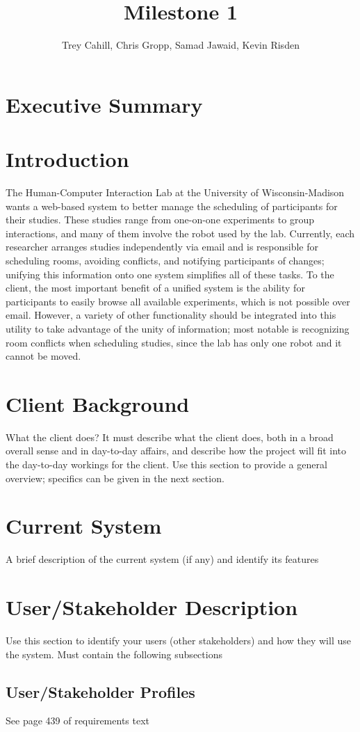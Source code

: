 \documentclass{article}
\title{Milestone 1}
\author{Trey Cahill, Chris Gropp, Samad Jawaid, Kevin Risden}
\begin{document}
\maketitle
\section{Executive Summary}
\section{Introduction}
The Human-Computer Interaction Lab at the University of Wisconsin-Madison wants a web-based system to better manage the scheduling of participants for their studies.  These studies range from one-on-one experiments to group interactions, and many of them involve the robot used by the lab.  Currently, each researcher arranges studies independently via email and is responsible for scheduling rooms, avoiding conflicts, and notifying participants of changes; unifying this information onto one system simplifies all of these tasks.  To the client, the most important benefit of a unified system is the ability for participants to easily browse all available experiments, which is not possible over email.  However, a variety of other functionality should be integrated into this utility to take advantage of the unity of information; most notable is recognizing room conflicts when scheduling studies, since the lab has only one robot and it cannot be moved.
\section{Client Background}
What the client does? It must describe what the client does, both in a broad overall sense and in day-to-day affairs, and describe how the project will fit into the day-to-day workings for the client. Use this section to provide a general overview; specifics can be given in the next section.
\section{Current System}
A brief description of the current system (if any) and identify its features
\section{User/Stakeholder Description}
Use this section to identify your users (other stakeholders) and how they will use the system. Must contain the following subsections
\subsection{User/Stakeholder Profiles}
See page 439 of requirements text
\end{document}
